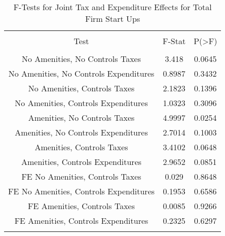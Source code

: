 
\begin{table}[!htbp] \centering 
  \caption{F-Tests for Joint Tax and Expenditure Effects for Total Firm Start Ups} 
  \label{--Ftests} 
\begin{tabular}{@{\extracolsep{5pt}} ccc} 
\\[-1.8ex]\hline 
\hline \\[-1.8ex] 
Test & F-Stat & P(\textgreater F) \\ 
\hline \\[-1.8ex] 
No Amenities, No Controls Taxes & 3.418 & 0.0645 \\ 
No Amenities, No Controls Expenditures & 0.8987 & 0.3432 \\ 
No Amenities, Controls Taxes & 2.1823 & 0.1396 \\ 
No Amenities, Controls Expenditures & 1.0323 & 0.3096 \\ 
Amenities, No Controls Taxes & 4.9997 & 0.0254 \\ 
Amenities, No Controls Expenditures & 2.7014 & 0.1003 \\ 
Amenities, Controls Taxes & 3.4102 & 0.0648 \\ 
Amenities, Controls Expenditures & 2.9652 & 0.0851 \\ 
FE No Amenities, Controls Taxes & 0.029 & 0.8648 \\ 
FE No Amenities, Controls Expenditures & 0.1953 & 0.6586 \\ 
FE Amenities, Controls Taxes & 0.0085 & 0.9266 \\ 
FE Amenities, Controls Expenditures & 0.2325 & 0.6297 \\ 
\hline \\[-1.8ex] 
\end{tabular} 
\end{table} 
